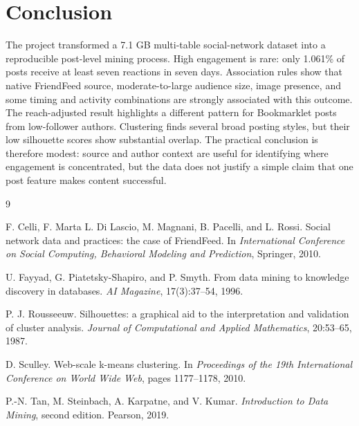 \documentclass[10pt,a4paper]{article}
\begin{document}
\section{Conclusion}

The project transformed a 7.1 GB multi-table social-network dataset into a reproducible post-level mining process. High engagement is rare: only 1.061\% of posts receive at least seven reactions in seven days. Association rules show that native FriendFeed source, moderate-to-large audience size, image presence, and some timing and activity combinations are strongly associated with this outcome. The reach-adjusted result highlights a different pattern for Bookmarklet posts from low-follower authors. Clustering finds several broad posting styles, but their low silhouette scores show substantial overlap. The practical conclusion is therefore modest: source and author context are useful for identifying where engagement is concentrated, but the data does not justify a simple claim that one post feature makes content successful.

\begin{thebibliography}{9}

F. Celli, F. Marta L. Di Lascio, M. Magnani, B. Pacelli, and L. Rossi.
\newblock Social network data and practices: the case of FriendFeed.
\newblock In \emph{International Conference on Social Computing, Behavioral Modeling and Prediction}, Springer, 2010.

U. Fayyad, G. Piatetsky-Shapiro, and P. Smyth.
\newblock From data mining to knowledge discovery in databases.
\newblock \emph{AI Magazine}, 17(3):37--54, 1996.

P. J. Rousseeuw.
\newblock Silhouettes: a graphical aid to the interpretation and validation of cluster analysis.
\newblock \emph{Journal of Computational and Applied Mathematics}, 20:53--65, 1987.

D. Sculley.
\newblock Web-scale k-means clustering.
\newblock In \emph{Proceedings of the 19th International Conference on World Wide Web}, pages 1177--1178, 2010.

P.-N. Tan, M. Steinbach, A. Karpatne, and V. Kumar.
\newblock \emph{Introduction to Data Mining}, second edition.
\newblock Pearson, 2019.

\end{thebibliography}
\end{document}
